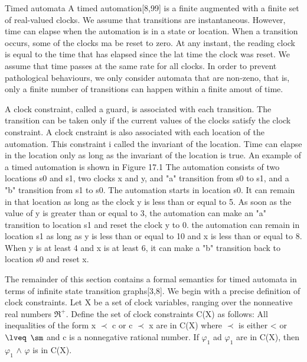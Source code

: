 Timed automata
A timed automation[8,99] is a finite augmented with a finite set of  real-valued clocks. We assume that transitions are instantaneous. However, time can elapse when the automation is in a state or location. When a transition occurs, some of the clocks ma be reset to zero. At any instant, the reading clock is equal to the time that has elapsed since the lat time the clock was reset. We assume that time passes at the same rate for all clocks. In order to prevent pathological behaviours, we only consider automata that are non-zeno, that is, only a finite number of transitions can happen within a finite amout of time.

A clock constraint, called a guard, is associated with each transition. The transition can be taken only if the current values of the clocks satisfy the clock constraint. A clock cnstraint is also associated with each location of the automation. This constraint i called the invariant of the location. Time can elapse in the location only as long as the invariant of the location is true. An example of a timed automation is shown in Figure 17.1 The automation consists of two locations s0 and s1, two clocks x and y, and "a" transition from s0 to s1, and a "b" transition from s1 to s0. The automation starts in location s0. It can remain in that location as long as the clock y is less than or equal to 5. As soon as the value of y is greater than or equal to 3, the  automation can make an "a" transition to location s1 and reset the clock y to 0. the automation can remain in location s1 as long as y is less than or equal to 10 and x is less than or equal to 8. When y is at least 4 and x is at least 6, it can make a "b" transition back to location s0 and reset x.

The remainder of this section contains a formal semantics for timed automata in terms of infinite state transition graphs[3,8]. We begin with a precise definition of clock constraints. Let X be a set of clock variables, ranging over the nonneative real numbers $\Re^{+}$. Define the set of clock constraints C(X) as follows:
All inequalities of the form x $\prec$ c or c $\prec$ x are in C(X) where $\prec$ is either < or  $\lveq$ $\sm$ and c is a nonnegative rational number.
If $\varphi_1$ ad $\varphi_{1}$ are in C(X), then $\varphi_1$ $\wedge$ $\varphi$ is in C(X).

